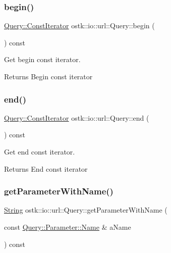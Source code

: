 \subsubsection{\texorpdfstring{begin()}{begin()}}
{\footnotesize\ttfamily \hyperlink{classostk_1_1io_1_1url_1_1_query_a64eb73f998c55a48d25b4ce116d66f1a}{Query\+::\+Const\+Iterator} ostk\+::io\+::url\+::\+Query\+::begin (\begin{DoxyParamCaption}{ }\end{DoxyParamCaption}) const}



Get begin const iterator. 

\begin{DoxyReturn}{Returns}
Begin const iterator 
\end{DoxyReturn}
\mbox{\label{classostk_1_1io_1_1url_1_1_query_a94eb24357dcf96fb9926903019b057da}} 
\subsubsection{\texorpdfstring{end()}{end()}}
{\footnotesize\ttfamily \hyperlink{classostk_1_1io_1_1url_1_1_query_a64eb73f998c55a48d25b4ce116d66f1a}{Query\+::\+Const\+Iterator} ostk\+::io\+::url\+::\+Query\+::end (\begin{DoxyParamCaption}{ }\end{DoxyParamCaption}) const}



Get end const iterator. 

\begin{DoxyReturn}{Returns}
End const iterator 
\end{DoxyReturn}
\mbox{\label{classostk_1_1io_1_1url_1_1_query_ac55b9803b0807160ea5aa42912b412b4}} 
\subsubsection{\texorpdfstring{get\+Parameter\+With\+Name()}{getParameterWithName()}}
{\footnotesize\ttfamily \hyperlink{namespaceostk_1_1io_a95d49b120613a7610cb1b4f03b1116b6}{String} ostk\+::io\+::url\+::\+Query\+::get\+Parameter\+With\+Name (\begin{DoxyParamCaption}\item[{const \hyperlink{classostk_1_1io_1_1url_1_1_query_1_1_parameter_ad176899a3555e0d0efeb0c13f73a8a80}{Query\+::\+Parameter\+::\+Name} \&}]{a\+Name }\end{DoxyParamCaption}) const}



